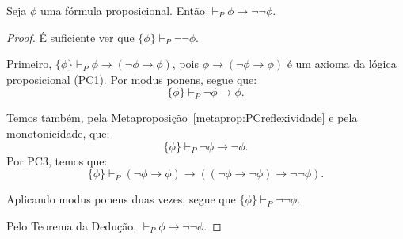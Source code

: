 \begin{metaproposition}\label{metaprop:PC13reciproca}Seja $\phi$ uma fórmula proposicional.
    Então $\vdash_P \phi \rightarrow \neg\neg \phi$.
\end{metaproposition}
\begin{proof}
    É suficiente ver que $\{\phi\} \vdash_P \neg\neg \phi$.

    Primeiro, $\{\phi\} \vdash_P \phi\rightarrow (\neg \phi \rightarrow \phi)$, pois $\phi\rightarrow (\neg \phi \rightarrow \phi)$ é um axioma da lógica proposicional (PC1).
    Por modus ponens, segue que:
    \[
        \{\phi\} \vdash_P \neg \phi \rightarrow \phi.
    \]

    Temos também, pela Metaproposição~\ref{metaprop:PCreflexividade} e pela monotonicidade, que:
    \[
        \{\phi\} \vdash_P \neg\phi\rightarrow \neg\phi.
    \]
    Por PC3, temos que:
    \[
        \{\phi\} \vdash_P (\neg \phi \rightarrow \phi) \rightarrow ((\neg \phi \rightarrow \neg \phi) \rightarrow \neg \neg \phi).
    \]

    Aplicando modus ponens duas vezes, segue que $\{\phi\} \vdash_P \neg\neg \phi$.

    Pelo Teorema da Dedução, $\vdash_P \phi \rightarrow \neg\neg \phi$.
\end{proof}

